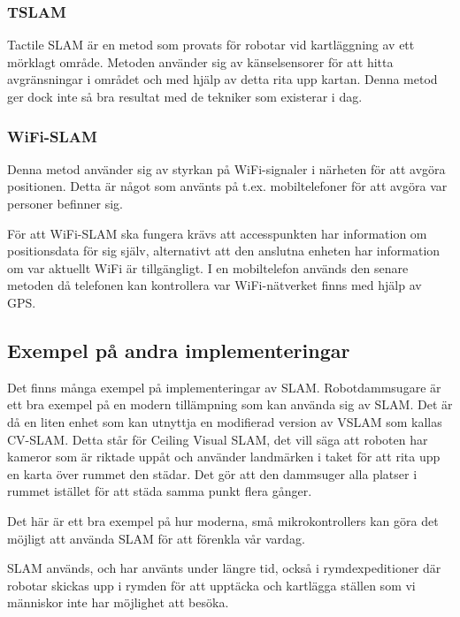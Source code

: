 \documentclass[a4paper,12pt,fleqn]{article}
\begin{document}
\subsubsection{TSLAM}
Tactile SLAM är en metod som provats för robotar vid kartläggning av ett mörklagt område. Metoden använder sig av känselsensorer för att hitta avgränsningar i området och med hjälp av detta rita upp kartan. Denna metod ger dock inte så bra resultat med de tekniker som existerar i dag.

\subsubsection{WiFi-SLAM}
Denna metod använder sig av styrkan på WiFi-signaler i närheten för att avgöra positionen. Detta är något som använts på t.ex. mobiltelefoner för att avgöra var personer befinner sig. 

För att WiFi-SLAM ska fungera krävs att accesspunkten har information om positionsdata för sig själv, alternativt att den anslutna enheten har information om var aktuellt WiFi är tillgängligt. I en mobiltelefon används den senare metoden då telefonen kan kontrollera var WiFi-nätverket finns med hjälp av GPS. 

\subsection{Exempel på andra implementeringar}

Det finns många exempel på implementeringar av SLAM. Robotdammsugare är ett bra exempel på en modern tillämpning som kan använda sig av SLAM. Det är då en liten enhet som kan utnyttja en modifierad version av VSLAM som kallas CV-SLAM. Detta står för Ceiling Visual SLAM, det vill säga att roboten har kameror som är riktade uppåt och använder landmärken i taket för att rita upp en karta över rummet den städar. Det gör att den dammsuger alla platser i rummet istället för att städa samma punkt flera gånger. 

Det här är ett bra exempel på hur moderna, små mikrokontrollers kan göra det möjligt att använda SLAM för att förenkla vår vardag.

SLAM används, och har använts under längre tid, också i rymdexpeditioner där robotar skickas upp i rymden för att upptäcka och kartlägga ställen som vi människor inte har möjlighet att besöka. 

\newpage
\end{document}

